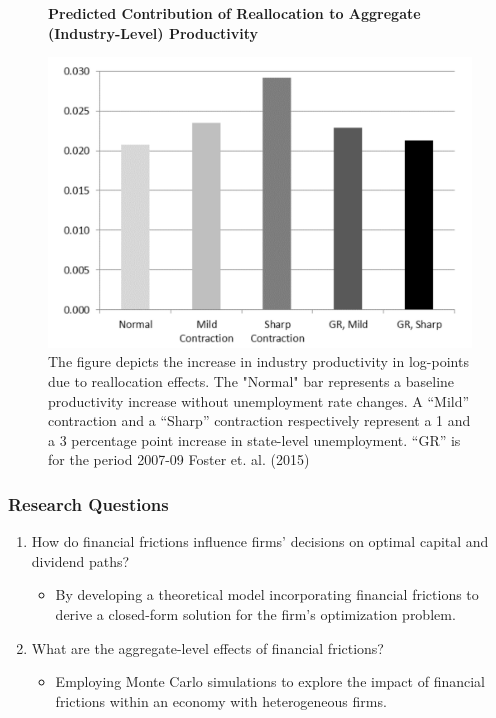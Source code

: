 \documentclass{beamer}
\begin{document}
\begin{frame}
    \begin{figure}
        
        \centering
        \textbf{Predicted Contribution of Reallocation to Aggregate (Industry-Level) Productivity}\par\medskip
        \includegraphics[scale=0.24]{GreatRecession.png}        
        \caption{The figure depicts the increase in industry productivity in log-points due to reallocation effects. The "Normal" bar represents a baseline productivity increase without unemployment rate changes. A “Mild” contraction  and a “Sharp” contraction respectively represent a 1 and a 3 percentage point increase in state-level unemployment. “GR” is for the
period 2007-09 Foster et. al. (2015)
}
        \label{fig:enter-label}
    \end{figure}
\end{frame}
\begin{frame}
    \frametitle{Research Questions}
    \begin{enumerate}
        \item How do financial frictions influence firms' decisions on optimal capital and dividend paths?
        \begin{itemize}
            \item By developing a theoretical model incorporating financial frictions to derive a closed-form solution for the firm's optimization problem.
        \end{itemize}
        \item What are the aggregate-level effects of financial frictions?
        \begin{itemize}
            \item Employing Monte Carlo simulations to explore the impact of financial frictions within an economy with heterogeneous firms.
        \end{itemize}
    \end{enumerate}
\end{frame}
\end{document}
